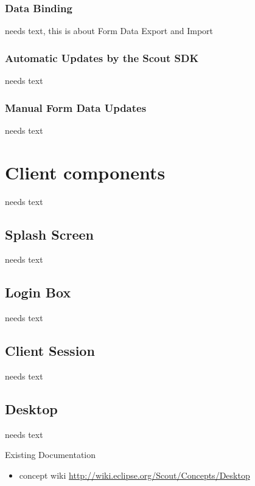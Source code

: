 \documentclass[a4paper,10pt,twoside]{book}
\begin{document}
\subsection{Data Binding}
needs text, this is about Form Data Export and Import

\subsection{Automatic Updates by the Scout SDK}
needs text

\subsection{Manual Form Data Updates}
needs text

\chapter{Client components}
needs text

\section{Splash Screen}
needs text

\section{Login Box}
needs text

\section{Client Session}
needs text

\section{Desktop}
needs text

\noindent Existing Documentation
\begin{itemize}
  \item concept wiki \url{http://wiki.eclipse.org/Scout/Concepts/Desktop}
\end{itemize}
\end{document}
